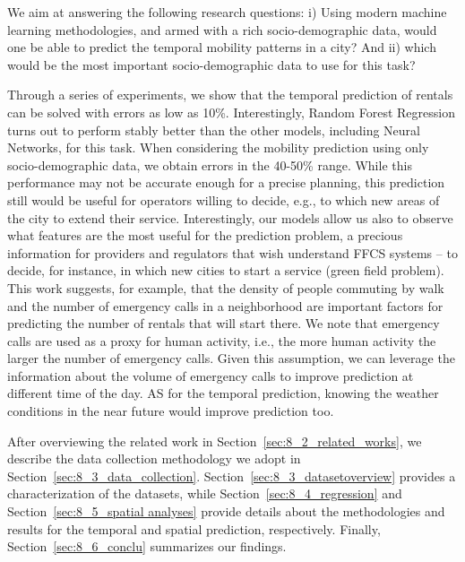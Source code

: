 We aim at answering the following research questions: i) Using modern machine learning methodologies, and armed with a rich socio-demographic data, would one be able to predict the temporal mobility patterns in a city?  
And ii) which would be the most important socio-demographic data to use for this task?


Through a series of experiments, we show that the temporal prediction of rentals can be solved with errors as low as 10\%. Interestingly, Random Forest Regression turns out to perform stably better than the other models, including Neural Networks, for this task.
When considering the mobility prediction using only socio-demographic data, we obtain errors in the 40-50\% range. While this performance may not be accurate enough for a precise planning, this prediction still would be useful for operators willing to decide, e.g., to which new areas of the city to extend their service.  Interestingly, our models allow us also to observe what features are the most useful for the prediction problem, a precious information for providers and regulators that wish understand FFCS systems -- to decide, for instance, in which new cities to start a service (green field problem). 
This work suggests, for example, that the density of people commuting by walk and the number of emergency calls in a neighborhood are important factors for predicting the number of rentals that will start there. 
We note that emergency calls are used as a proxy for human activity, i.e., the more human activity the larger the number of emergency calls. Given this assumption, we can leverage the information about the volume of emergency calls to improve prediction at different time of the day.
AS for the temporal prediction, knowing the weather conditions in the near future would improve prediction too. 

After overviewing the related work in Section~\ref{sec:8_2_related_works}, we describe the data collection methodology we adopt in Section~\ref{sec:8_3_data_collection}. Section~\ref{sec:8_3_datasetoverview} provides a characterization of the datasets, while Section~\ref{sec:8_4_regression} and Section~\ref{sec:8_5_spatial analyses} provide details about the methodologies and results for the temporal and spatial prediction, respectively. Finally, Section~\ref{sec:8_6_conclu} summarizes our findings.